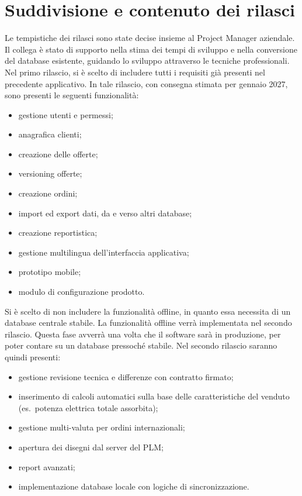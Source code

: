 \section{Suddivisione e contenuto dei rilasci}
Le tempistiche dei rilasci sono state
decise insieme al Project Manager aziendale.
Il collega è stato di supporto nella stima dei tempi di sviluppo e nella
conversione del database esistente, guidando lo sviluppo attraverso le tecniche professionali.
Nel primo rilascio, si è scelto di includere tutti i requisiti già
presenti nel precedente applicativo.
In tale rilascio, con consegna stimata per gennaio 2027, sono presenti le
seguenti funzionalità:
\begin{itemize}
    \item gestione utenti e permessi;
    \item anagrafica clienti;
    \item creazione delle offerte;
    \item versioning offerte;
    \item creazione ordini;
    \item import ed export dati, da e verso altri database;
    \item creazione reportistica;
    \item gestione multilingua dell'interfaccia applicativa;
    \item prototipo mobile;
    \item modulo di configurazione prodotto.
\end{itemize}
Si è scelto di non includere la funzionalità offline,
in quanto essa necessita di un database centrale stabile.
La funzionalità offline verrà implementata nel secondo rilascio.
Questa fase avverrà una volta che il software sarà in produzione, per poter contare su un database pressoché stabile.
Nel secondo rilascio saranno quindi presenti:
\begin{itemize}
    \item gestione revisione tecnica e differenze con contratto firmato;
    \item inserimento di calcoli automatici sulla base delle caratteristiche del venduto (es.\ potenza elettrica totale assorbita);
    \item gestione multi-valuta per ordini internazionali;
    \item apertura dei disegni \pdf{} dal server del \ac{PLM};
    \item report avanzati;
    \item implementazione database locale con logiche di sincronizzazione.
\end{itemize}

